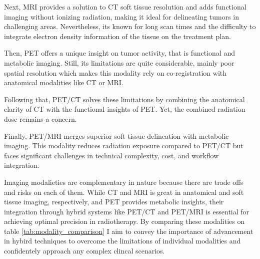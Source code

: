 \documentclass[11pt]{article} %
\begin{document}
Next, MRI provides a solution to CT soft tissue resolution and adds functional imaging without ionizing radiation, making it ideal for delineating tumors in challenging areas.  Nevertheless, its known for long scan times and the difficulty to integrate electron density information of the tissue on the treatment plan. 

Then, PET offers a unique insight on tumor activity, that is functional and metabolic imaging. Still, its limitations are quite considerable, mainly poor spatial resolution which makes this modality rely on co-registration with anatomical modalities like CT or MRI. 

Following that, PET/CT solves these limitations by combining the anatomical clarity of CT with the functional insights of PET. Yet, the combined radiation dose remains a concern. 

Finally, PET/MRI merges superior soft tissue delineation with metabolic imaging. This modality reduces radiation exposure compared to PET/CT but faces significant challenges in technical complexity, cost, and workflow integration.

Imaging modalieties are complementary in nature because there are trade offs and risks on each of them. While CT and MRI is great in anatomical and soft tissue imaging, respectively, and PET provides metabolic insights, their integration through hybrid systems like PET/CT and PET/MRI is essential for achieving optimal precision in radiotherapy. By comparing these modalities on table \ref{tab:modality_comparison} I aim to convey the importance of  advancement in hybird techniques to overcome the limitations of individual modalities and  confidentely approach any complex clincal scenarios.
\end{document}
